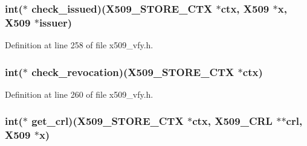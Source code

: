 \subsubsection[{\texorpdfstring{check\+\_\+issued}{check_issued}}]{\setlength{\rightskip}{0pt plus 5cm}int($\ast$ check\+\_\+issued)({\bf X509\+\_\+\+S\+T\+O\+R\+E\+\_\+\+C\+TX} $\ast${\bf ctx}, {\bf X509} $\ast${\bf x}, {\bf X509} $\ast$issuer)}\hypertarget{structx509__store__ctx__st_a1d9c17fcd1eb6255bb12ff3e6cf2852b}{}\label{structx509__store__ctx__st_a1d9c17fcd1eb6255bb12ff3e6cf2852b}


Definition at line 258 of file x509\+\_\+vfy.\+h.

\subsubsection[{\texorpdfstring{check\+\_\+revocation}{check_revocation}}]{\setlength{\rightskip}{0pt plus 5cm}int($\ast$ check\+\_\+revocation)({\bf X509\+\_\+\+S\+T\+O\+R\+E\+\_\+\+C\+TX} $\ast${\bf ctx})}\hypertarget{structx509__store__ctx__st_ac12df49e4e4808ab998230f834870cce}{}\label{structx509__store__ctx__st_ac12df49e4e4808ab998230f834870cce}


Definition at line 260 of file x509\+\_\+vfy.\+h.

\subsubsection[{\texorpdfstring{get\+\_\+crl}{get_crl}}]{\setlength{\rightskip}{0pt plus 5cm}int($\ast$ get\+\_\+crl)({\bf X509\+\_\+\+S\+T\+O\+R\+E\+\_\+\+C\+TX} $\ast${\bf ctx}, {\bf X509\+\_\+\+C\+RL} $\ast$$\ast$crl, {\bf X509} $\ast${\bf x})}\hypertarget{structx509__store__ctx__st_af9ee5fc1ed05834912007fd603bf8b86}{}\label{structx509__store__ctx__st_af9ee5fc1ed05834912007fd603bf8b86}



